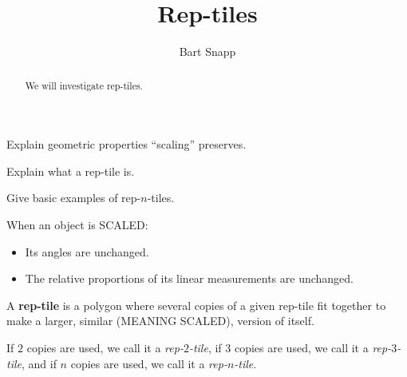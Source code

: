 \documentclass[nooutcomes,noauthor,hints]{ximera}
\title{Rep-tiles}
\author{Bart Snapp}
\begin{document}
\begin{abstract}
  We will investigate rep-tiles.
\end{abstract}
\maketitle



\begin{listOutcomes}
\item Explain geometric properties ``scaling'' preserves.
\item Explain what a rep-tile is.
\item Give basic examples of rep-$n$-tiles.
\end{listOutcomes}

When an object is SCALED:
\begin{itemize}
\item Its angles are unchanged.
\item The relative proportions of its linear measurements are
  unchanged.
\end{itemize}
A \textbf{rep-tile} is a polygon where several copies
of a given rep-tile fit together to make a larger, similar (MEANING
SCALED), version of itself. 



If $2$ copies are used, we call it a
\textit{rep-$2$-tile}, if $3$ copies are used, we call it a
\textit{rep-$3$-tile}, and if $n$ copies are used, we call it a
\textit{rep-$n$-tile}.

\mynewpage
\end{document}
